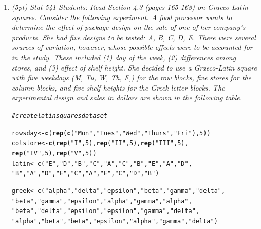 \documentclass{article}\usepackage[]{graphicx}\usepackage[]{color}
\makeatletter
\newcommand{\hlnum}[1]{\textcolor[rgb]{0.686,0.059,0.569}{#1}}%
\newcommand{\hlstr}[1]{\textcolor[rgb]{0.192,0.494,0.8}{#1}}%
\newcommand{\hlcom}[1]{\textcolor[rgb]{0.678,0.584,0.686}{\textit{#1}}}%
\newcommand{\hlstd}[1]{\textcolor[rgb]{0.345,0.345,0.345}{#1}}%
\newcommand{\hlkwb}[1]{\textcolor[rgb]{0.69,0.353,0.396}{#1}}%
\newcommand{\hlkwd}[1]{\textcolor[rgb]{0.737,0.353,0.396}{\textbf{#1}}}%
\newenvironment{kframe}{%
 \def\at@end@of@kframe{}%
 \ifinner\ifhmode%
  \def\at@end@of@kframe{\end{minipage}}%
  \begin{minipage}{\columnwidth}%
 \fi\fi%
 \def\FrameCommand##1{\hskip\@totalleftmargin \hskip-\fboxsep
 \colorbox{shadecolor}{##1}\hskip-\fboxsep
     \hskip-\linewidth \hskip-\@totalleftmargin \hskip\columnwidth}%
 \MakeFramed {\advance\hsize-\width
   \@totalleftmargin\z@ \linewidth\hsize
   \@setminipage}}%
 {\par\unskip\endMakeFramed%
 \at@end@of@kframe}
\newenvironment{knitrout}{}{} %
\makeatother
\begin{document}
\begin{enumerate}
\begin{enumerate}
\end{enumerate}


\item %
{\it  (5pt) Stat 541 Students: Read Section 4.3 (pages 165-168) on Graeco-Latin squares. Consider the
following experiment. A food processor wants to determine the effect of package design on the sale of
one of her company's products. She had five designs to be tested: A, B, C, D, E. There were several
sources of variation, however, whose possible effects were to be accounted for in the study. These
included (1) day of the week, (2) differences among stores, and (3) effect of shelf height. She decided
to use a Graeco-Latin square with five weekdays (M, Tu, W, Th, F,) for the row blocks, five stores
for the column blocks, and five shelf heights for the Greek letter blocks. The experimental design
and sales in dollars are shown in the following table.
}

\begin{knitrout}\footnotesize
{}\color{fgcolor}\begin{kframe}
\begin{alltt}
\hlcom{# create latin squares data set}

\hlstd{rowsday} \hlkwb{<-} \hlkwd{c}\hlstd{(}\hlkwd{rep}\hlstd{(}\hlkwd{c}\hlstd{(}\hlstr{"Mon"}\hlstd{,} \hlstr{"Tues"}\hlstd{,} \hlstr{"Wed"}\hlstd{,} \hlstr{"Thurs"}\hlstd{,} \hlstr{"Fri"}\hlstd{),}\hlnum{5}\hlstd{))}
\hlstd{colstore} \hlkwb{<-} \hlkwd{c}\hlstd{(}\hlkwd{rep}\hlstd{(}\hlstr{"I"}\hlstd{,} \hlnum{5}\hlstd{),} \hlkwd{rep}\hlstd{(}\hlstr{"II"}\hlstd{,} \hlnum{5}\hlstd{),} \hlkwd{rep}\hlstd{(}\hlstr{"III"}\hlstd{,} \hlnum{5}\hlstd{),}
              \hlkwd{rep}\hlstd{(}\hlstr{"IV"}\hlstd{,} \hlnum{5}\hlstd{),} \hlkwd{rep}\hlstd{(}\hlstr{"V"}\hlstd{,} \hlnum{5}\hlstd{))}
\hlstd{latin} \hlkwb{<-} \hlkwd{c}\hlstd{(}\hlstr{"E"}\hlstd{,} \hlstr{"D"}\hlstd{,} \hlstr{"B"}\hlstd{,} \hlstr{"C"}\hlstd{,} \hlstr{"A"}\hlstd{,} \hlstr{"C"}\hlstd{,} \hlstr{"B"}\hlstd{,} \hlstr{"E"}\hlstd{,} \hlstr{"A"}\hlstd{,} \hlstr{"D"}\hlstd{,}
           \hlstr{"B"}\hlstd{,} \hlstr{"A"}\hlstd{,} \hlstr{"D"}\hlstd{,} \hlstr{"E"}\hlstd{,} \hlstr{"C"}\hlstd{,}\hlstr{"A"}\hlstd{,} \hlstr{"E"}\hlstd{,} \hlstr{"C"}\hlstd{,} \hlstr{"D"}\hlstd{,} \hlstr{"B"}\hlstd{)}

\hlstd{greek} \hlkwb{<-} \hlkwd{c}\hlstd{(}\hlstr{"alpha"}\hlstd{,} \hlstr{"delta"}\hlstd{,} \hlstr{"epsilon"}\hlstd{,} \hlstr{"beta"}\hlstd{,} \hlstr{"gamma"}\hlstd{,} \hlstr{"delta"}\hlstd{,}
           \hlstr{"beta"}\hlstd{,} \hlstr{"gamma"}\hlstd{,} \hlstr{"epsilon"}\hlstd{,} \hlstr{"alpha"}\hlstd{,} \hlstr{"gamma"}\hlstd{,} \hlstr{"alpha"}\hlstd{,}
           \hlstr{"beta"}\hlstd{,} \hlstr{"delta"}\hlstd{,} \hlstr{"epsilon"}\hlstd{,} \hlstr{"epsilon"}\hlstd{,} \hlstr{"gamma"}\hlstd{,} \hlstr{"delta"}\hlstd{,}
           \hlstr{"alpha"}\hlstd{,} \hlstr{"beta"}\hlstd{,} \hlstr{"beta"}\hlstd{,} \hlstr{"epsilon"}\hlstd{,} \hlstr{"alpha"}\hlstd{,} \hlstr{"gamma"}\hlstd{,} \hlstr{"delta"}\hlstd{)}


\end{alltt}
\end{kframe}
\end{knitrout}
\end{enumerate}
\end{document}
